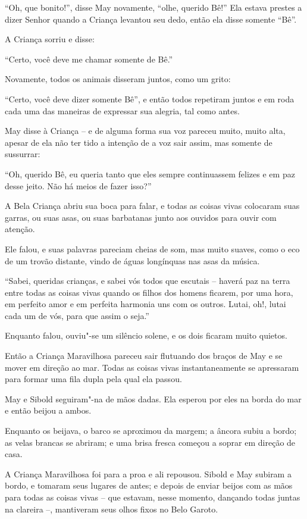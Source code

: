 ``Oh, que bonito!'', disse May novamente, ``olhe, querido Bê!'' Ela
estava prestes a dizer Senhor quando a Criança levantou seu dedo, então
ela disse somente ``Bê''.

A Criança sorriu e disse:

``Certo, você deve me chamar somente de Bê.''

Novamente, todos os animais disseram juntos, como um grito:

``Certo, você deve dizer somente Bê'', e então todos
repetiram juntos e em roda cada uma das maneiras de expressar sua
alegria, tal como antes.

May disse à Criança -- e de alguma forma sua voz pareceu muito, muito
alta, apesar de ela não ter tido a intenção de a voz sair assim, mas somente de
sussurrar:

``Oh, querido Bê, eu queria tanto que eles sempre continuassem felizes e
em paz desse jeito. Não há meios de fazer isso?''

A Bela Criança abriu sua boca para falar, e todas as coisas vivas
colocaram suas garras, ou suas asas, ou suas barbatanas junto aos ouvidos para
ouvir com atenção.

Ele falou, e suas palavras pareciam cheias de som, mas muito suaves,
como o eco de um trovão distante, vindo de águas longínquas nas asas da
música.

``Sabei, queridas crianças, e sabei vós todos que escutais -- haverá paz
na terra entre todas as coisas vivas quando os filhos dos homens
ficarem, por uma hora, em perfeito amor e em perfeita harmonia uns com os
outros. Lutai, oh!, lutai cada um de vós, para que assim o seja.''

Enquanto falou, ouviu"-se um silêncio solene, e os dois ficaram muito
quietos.

Então a Criança Maravilhosa pareceu sair flutuando dos braços de May e
se mover em direção ao mar. Todas as coisas vivas instantaneamente se
apressaram para formar uma fila dupla pela qual ela passou.

May e Sibold seguiram"-na de mãos dadas. Ela esperou por eles na borda do
mar e então beijou a ambos.

Enquanto os beijava, o barco se aproximou da margem; a âncora subiu
a bordo; as velas brancas se abriram; e uma brisa fresca
começou a soprar em direção de casa.

A Criança Maravilhosa foi para a proa e ali repousou. Sibold e May
subiram a bordo, e tomaram seus lugares de antes; e depois de enviar
beijos com as mãos para todas as coisas vivas -- que estavam, nesse
momento, dançando todas juntas na clareira --, mantiveram seus olhos
fixos no Belo Garoto.

